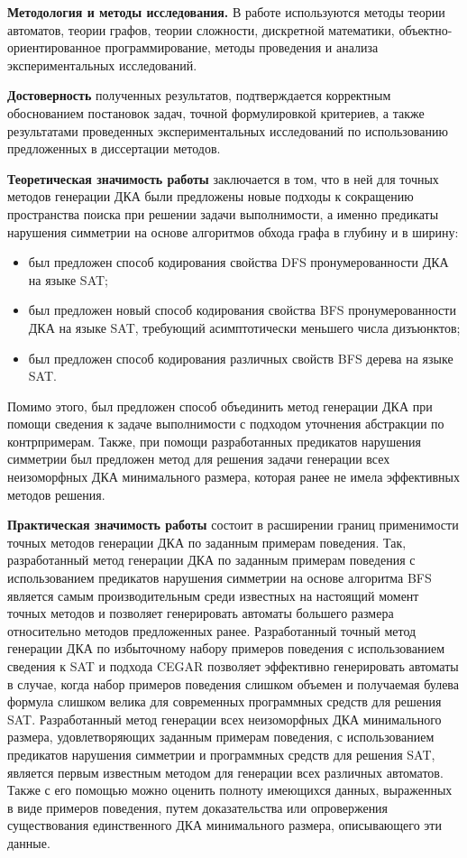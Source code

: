 \textbf{Методология и методы исследования.} В работе используются методы теории автоматов, теории графов, теории сложности, дискретной математики, объектно-ориентированное программирование, методы проведения и анализа экспериментальных исследований.

\textbf{Достоверность} полученных результатов, подтверждается корректным обоснованием постановок задач, точной формулировкой критериев, а также результатами проведенных экспериментальных исследований по использованию предложенных в диссертации методов.

\textbf{Теоретическая значимость работы} заключается в том, что в ней для точных методов генерации ДКА были предложены новые подходы к сокращению пространства поиска при решении задачи выполнимости, а именно предикаты нарушения симметрии на основе алгоритмов обхода графа в глубину и в ширину:
\begin{itemize}
  \item был предложен способ кодирования свойства DFS пронумерованности ДКА на языке SAT;
  \item был предложен новый способ кодирования свойства BFS пронумерованности ДКА на языке SAT, требующий асимптотически меньшего числа дизъюнктов;
  \item был предложен способ кодирования различных свойств BFS дерева на языке SAT.
\end{itemize}
Помимо этого, был предложен способ объединить метод генерации ДКА при помощи сведения к задаче выполнимости с подходом уточнения абстракции по контрпримерам.
Также, при помощи разработанных предикатов нарушения симметрии был предложен метод для решения задачи генерации всех неизоморфных ДКА минимального размера, которая ранее не имела эффективных методов решения.

\textbf{Практическая значимость работы} состоит в расширении границ применимости точных методов генерации ДКА по заданным примерам поведения. 
Так, разработанный метод генерации ДКА по заданным примерам поведения с использованием предикатов нарушения симметрии на основе алгоритма BFS является самым производительным среди известных на настоящий момент точных методов и позволяет генерировать автоматы большего размера относительно методов предложенных ранее.
Разработанный точный метод генерации ДКА по избыточному набору примеров поведения с использованием сведения к SAT и подхода CEGAR позволяет эффективно генерировать автоматы в случае, когда набор примеров поведения слишком объемен и получаемая булева формула слишком велика для современных программных средств для решения SAT.
Разработанный метод генерации всех неизоморфных ДКА минимального размера, удовлетворяющих заданным примерам поведения, с использованием предикатов нарушения симметрии и программных средств для решения SAT, является первым известным методом для генерации всех различных автоматов.
Также с его помощью можно оценить полноту имеющихся данных, выраженных в виде примеров поведения, путем доказательства или опровержения существования единственного ДКА минимального размера, описывающего эти данные.  

